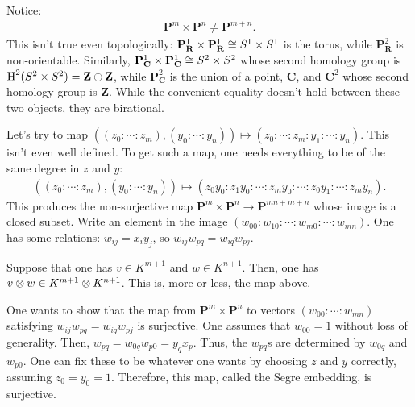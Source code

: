\documentclass [11 pt, oneside] {article}
\begin{document}
Notice:
\begin{align*}
	\mathbf{P}^m \times \mathbf{P}^n\ne \mathbf{P}^{m+n}.
\end{align*}
This isn't true even topologically: $\mathbf{P}^1_{\mathbf{R}}\times \mathbf{P}^1_{\mathbf{R}}\cong S^1\times S^1$ is the torus, while $\mathbf{P}^2_{\mathbf{R}}$ is non-orientable. Similarly, $\mathbf{P}^1_{\mathbf{C}}\times \mathbf{P}^1_{\mathbf{C}}\cong S^2\times S^2$ whose second homology group is $\operatorname{H}^2(S^2\times S^2) =  \mathbf{Z}\oplus \mathbf{Z}$, while $\mathbf{P}^2_{\mathbf{C}}$ is the union of a point, $\mathbf{C}$, and $\mathbf{C}^2$ whose second homology group is $\mathbf{Z}$. While the convenient equality doesn't hold between these two objects, they are birational.

Let's try to map $((z_0:\cdots:z_m), (y_0:\cdots:y_n))\longmapsto (z_0:\cdots:z_m:y_1:\cdots:y_n)$. This isn't even well defined. To get such a map, one needs everything to be of the same degree in $z$ and $y$:
\begin{align*}
	((z_0:\cdots:z_m), (y_0:\cdots:y_n))\longmapsto (z_0y_0:z_1y_0:\cdots:z_my_0:\cdots: z_0y_1:\cdots:z_my_n).
\end{align*}
This produces the non-surjective map $\mathbf{P}^m\times \mathbf{P}^n\longrightarrow \mathbf{P}^{mn+m+n}$ whose image is a closed subset. Write an element in the image $(w_{00}:w_{10}:\cdots: w_{m0} : \cdots: w_{mn})$. One has some relations: $w_{ij} = x_iy_j$, so $w_{ij}w_{pq}=w_{iq}w_{pj}$. 

Suppose that one has $v\in K^{m+1}$ and $w\in K^{n+1}$. Then, one has $v\otimes w \in K^{m+1}\otimes K^{n+1}$. This is, more or less, the map above.

One wants to show that the map from $\mathbf{P}^m\times \mathbf{P}^n$ to vectors $(w_{00}:\cdots:w_{mn})$ satisfying $w_{ij}w_{pq}=w_{iq}w_{pj}$ is surjective. One assumes that $w_{00}=1$ without loss of generality. Then, $w_{pq} = w_{0q}w_{p0}=y_qx_p$. Thus, the $w_{pq}$s are determined by $ w_{0q}$ and $w_{p0}$. One can fix these to be whatever one wants by choosing $z$ and $y$ correctly, assuming $z_0=y_0=1$. Therefore, this map, called the Segre embedding, is surjective.
\end{document}
